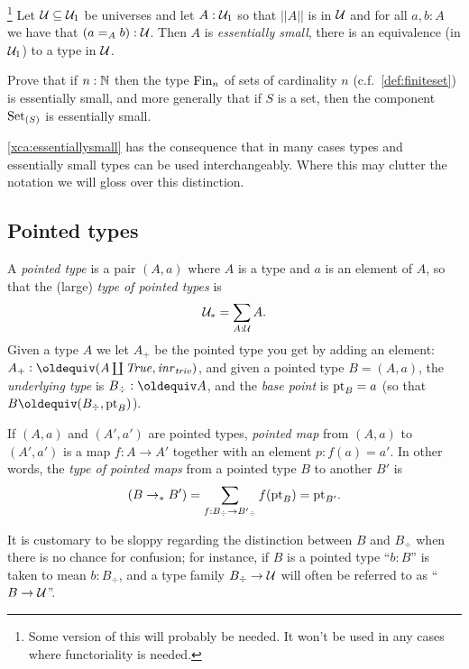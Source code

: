 \begin{definition}
\begin{xca}
 [\footnote{This tries to say that, nonfunctorially, a space is the disjoint union of its components.  Don't think we need it so it can propably be thrown away.}Assuming the appropriate form of axiom of choice \footnote{someone insert our choice}, prove that the path components define a family $A\to\UU$ factoring as $A\to||A||$ making sense of the equation ``$||A=\sum_{[a]:||A||}A_{[a]}||$''.]
\end{xca}
\begin{xca}\label{xca:essentiallysmall} \footnote{Some version of this will probably be needed.  It won't be used in any cases where functoriality is needed.}
  Let $\mathcal{U}\subseteq\mathcal{U}_1$ be universes and let $A:\mathcal{U}_1$ so that $||A||$ is in $\mathcal{U}$ and for all $a,b:A$ we have that $(a=_Ab):\mathcal{U}$.  Then $A$ is \emph{essentially small}, \ie there is an equivalence (in $\mathcal{U}_1$) to a type in $\mathcal{U}$.  

Prove that if $n:\mathbb{N}$ then the type $\mathrm{Fin}_n$ of sets of cardinality $n$  (c.f.~\cref{def:finiteset}) is essentially small, and more generally that if $S$ is a set, then the component $\mathord{\mathrm{Set}}_{(S)}$ is essentially small.  
\end{xca}
\cref{xca:essentiallysmall} has the consequence that in many cases types and essentially small types can be used interchangeably.  Where this may clutter the notation we will gloss over this distinction.

\subsection{Pointed types}
\label{sec:poitedtypes}
\begin{definition}\label{def:pointedtypes}
  A \emph{pointed type} is a pair $(A,a)$ where $A$ is a type and $a$ is an element of $A$, so that the (large) \emph{type of pointed types} is
$$\mathcal{U}_*=\sum_{A:\mathcal{U}}A.$$
Given a type $A$ we let $A_+$ be the pointed type you get by adding an element: $A_+\defequi(A\coprod\true,\inr{\triv})$, and given a pointed type $B=(A,a)$, the \emph{underlying type} is $B_\div\defequi A$, and the \emph{base point} is ${\mathord{\mathrm{pt}}}_B=a$ (so that $B\oldequiv (B_\div,\pt_B)$).  

If $(A,a)$ and $(A',a')$ are pointed types,  \emph{pointed map} from  $(A,a)$ to $(A',a')$ is a map $f:A\to A'$ together with an element $p:f(a)=a'$.  In other words, the \emph{type of pointed maps} from a pointed type $B$ to another $B'$ is
$$(B\to_*B')=\sum_{f:B_\div\to B'{}_\div}f({\mathord{\mathrm{pt}}}_B)={\mathord{\mathrm{pt}}}_{B'}.$$
\end{definition}
\begin{remark}
  It is customary to be sloppy regarding the distinction between $B$ and $B_\div$  when there is no chance for confusion; for instance, if $B$ is a pointed type ``$b:B$'' is taken to mean $b:B_\div$, and a type family $B_\div\to\mathcal{U}$ will often be referred to as ``$B\to\mathcal{U}$''.
\end{remark}


\end{definition}
